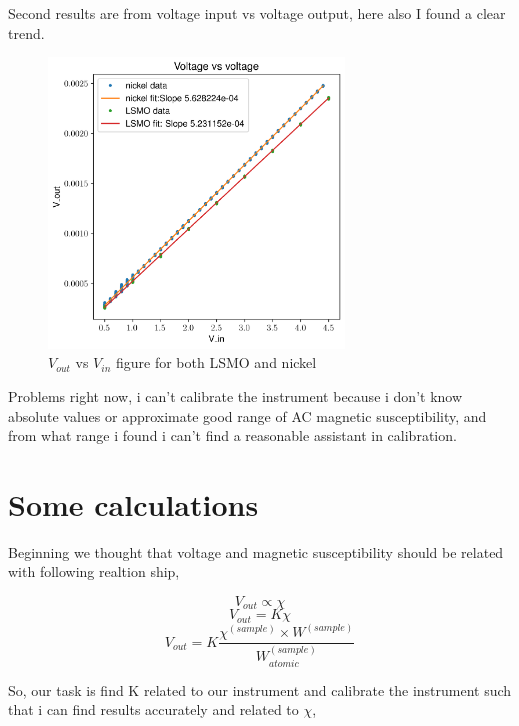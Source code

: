 \documentclass[a4paper,11pt]{article}
\begin{document}
\clearpage
Second results are from voltage input vs voltage output, here also I found a clear trend.

\begin{figure}[!hbt]\center
\includegraphics[width=0.7\textwidth]{voltage.png}
\caption{$V_{out}$ vs $V_{in}$ figure for both LSMO and nickel}
\end{figure}


\clearpage

Problems right now, i can’t calibrate the instrument because i don’t know absolute values or approximate good range of AC magnetic susceptibility, and from what range i found i can’t find a reasonable assistant in calibration. 


\section{Some calculations}
\label{sec:org26dd513}

Beginning we thought that voltage and magnetic susceptibility should be related with following realtion ship,

\begin{equation*}
V_{out} \propto \chi
\end{equation*}
\begin{equation*}
V_{out} = K \chi
\end{equation*}
\begin{equation*}
V_{out} = K \frac{\chi^{(sample)} \times W^{(sample)}}{W_{atomic}^{(sample)}}
\end{equation*}

So, our task is find K related to our instrument and calibrate the instrument such that i can find results accurately and related to \(\chi\),
\end{document}
